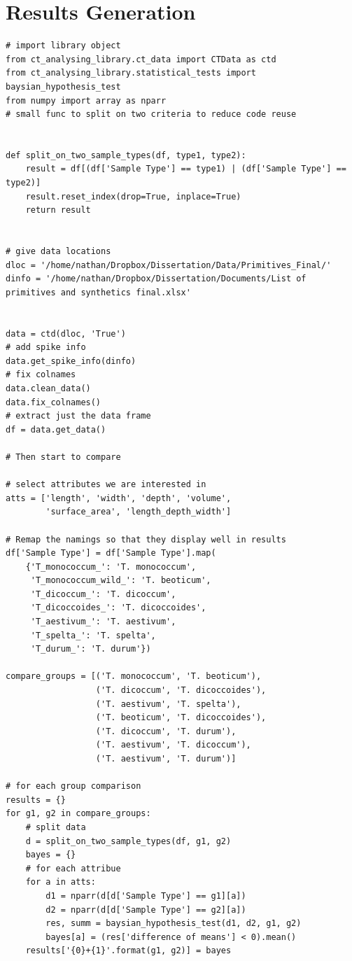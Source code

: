 \documentclass[11pt]{report}
\begin{document}
\section{Results Generation}
\label{sec:org6e0878f}
\label{org61bcfd9}
\begin{verbatim}
# import library object
from ct_analysing_library.ct_data import CTData as ctd
from ct_analysing_library.statistical_tests import baysian_hypothesis_test
from numpy import array as nparr
# small func to split on two criteria to reduce code reuse


def split_on_two_sample_types(df, type1, type2):
    result = df[(df['Sample Type'] == type1) | (df['Sample Type'] == type2)]
    result.reset_index(drop=True, inplace=True)
    return result


# give data locations
dloc = '/home/nathan/Dropbox/Dissertation/Data/Primitives_Final/'
dinfo = '/home/nathan/Dropbox/Dissertation/Documents/List of primitives and synthetics final.xlsx'


data = ctd(dloc, 'True')
# add spike info
data.get_spike_info(dinfo)
# fix colnames
data.clean_data()
data.fix_colnames()
# extract just the data frame
df = data.get_data()

# Then start to compare

# select attributes we are interested in
atts = ['length', 'width', 'depth', 'volume',
        'surface_area', 'length_depth_width']

# Remap the namings so that they display well in results
df['Sample Type'] = df['Sample Type'].map(
    {'T_monococcum_': 'T. monococcum',
     'T_monococcum_wild_': 'T. beoticum',
     'T_dicoccum_': 'T. dicoccum',
     'T_dicoccoides_': 'T. dicoccoides',
     'T_aestivum_': 'T. aestivum',
     'T_spelta_': 'T. spelta',
     'T_durum_': 'T. durum'})

compare_groups = [('T. monococcum', 'T. beoticum'),
                  ('T. dicoccum', 'T. dicoccoides'),
                  ('T. aestivum', 'T. spelta'),
                  ('T. beoticum', 'T. dicoccoides'),
                  ('T. dicoccum', 'T. durum'),
                  ('T. aestivum', 'T. dicoccum'),
                  ('T. aestivum', 'T. durum')]

# for each group comparison
results = {}
for g1, g2 in compare_groups:
    # split data
    d = split_on_two_sample_types(df, g1, g2)
    bayes = {}
    # for each attribue
    for a in atts:
        d1 = nparr(d[d['Sample Type'] == g1][a])
        d2 = nparr(d[d['Sample Type'] == g2][a])
        res, summ = baysian_hypothesis_test(d1, d2, g1, g2)
        bayes[a] = (res['difference of means'] < 0).mean()
    results['{0}+{1}'.format(g1, g2)] = bayes

\end{verbatim}
\end{document}
